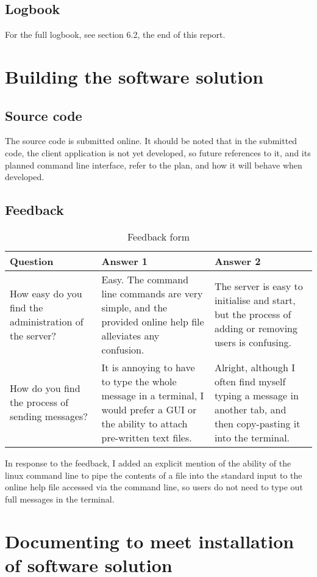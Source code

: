 \documentclass{article}
\begin{document}
\subsection{Logbook}
For the full logbook, see section 6.2, the end of this report.
\section{Building the software solution}
\subsection{Source code}
The source code is submitted online. It should be noted that in the submitted code, the client application is not yet developed, so future references to it, and its planned command line interface, refer to the plan, and how it will behave when developed.
\subsection{Feedback}
\begin{table}[H]
    \centering
    \caption{Feedback form}
    \begin{tabular}{p{}p{}p{}}
        \toprule
        \textbf{Question} & \textbf{Answer 1} & \textbf{Answer 2}\\
        \midrule
        How easy do you find the administration of the server? & Easy. The command line commands are very simple, and the provided online help file alleviates any confusion. & The server is easy to initialise and start, but the process of adding or removing users is confusing.\\
        \midrule
        How do you find the process of sending messages? & It is annoying to have to type the whole message in a terminal, I would prefer a GUI or the ability to attach pre-written text files. & Alright, although I often find myself typing a message in another tab, and then copy-pasting it into the terminal.\\
        \bottomrule
    \end{tabular}
    \label{tab:feedback}
\end{table}
In response to the feedback, I added an explicit mention of the ability of the linux command line to pipe the contents of a file into the standard input to the online help file accessed via the command line, so users do not need to type out full messages in the terminal.
\section{Documenting to meet installation of software solution}
\end{document}
